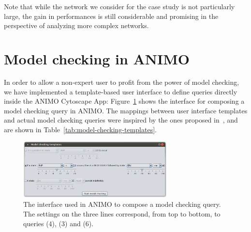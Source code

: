 \documentclass{llncs}
\begin{document}
Note that while the network we consider for the case study is not particularly large, the gain in performances is still considerable
and promising in the perspective of analyzing more complex networks.



\section{Model checking in ANIMO}\label{sec:animo-model-checking-ui}
In order to allow a non-expert user to profit from the power of model checking, we have implemented
a template-based user interface to define queries directly inside the ANIMO Cytoscape App:
Figure~\ref{fig:model-checking-ui} shows the interface for composing a model checking query in ANIMO.
The mappings between user interface templates and actual model checking queries were inspired
by the ones proposed in~\cite{hidde-templates}, and are shown in Table~\ref{tab:model-checking-templates}.

\begin{figure}[htb]
  \begin{center}
    \includegraphics[width=0.7\textwidth]{images/model_checking_ui}
  \end{center}
  \caption{The interface used in ANIMO to compose a model checking query.
  The settings on the three lines correspond, from top to bottom,
  to queries (4), (3) and (6).\label{fig:model-checking-ui}}
\end{figure}
\end{document}
